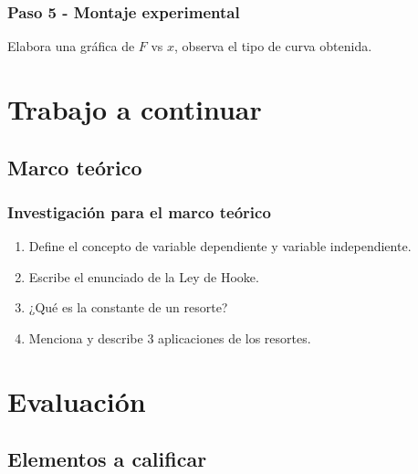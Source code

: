 \documentclass[14pt]{beamer}
\begin{document}
\begin{frame}
\frametitle{Paso 5 - Montaje experimental}
Elabora una gráfica de $F$ vs $x$, \pause observa el tipo de curva obtenida.
\end{frame}

\section{Trabajo a continuar}
\subsection{Marco teórico}


\begin{frame}
\frametitle{Investigación para el marco teórico}
\begin{enumerate}[<+->]
\item Define el concepto de variable dependiente y variable independiente.
\item Escribe el enunciado de la Ley de Hooke.
\item ¿Qué es la constante de un resorte?
\item Menciona y describe 3 aplicaciones de los resortes.
\end{enumerate}
\end{frame}

\section{Evaluación}
\subsection{Elementos a calificar}
\end{document}

